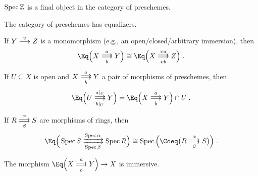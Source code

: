 \documentclass[a4paper,parskip=half,numbers=enddot, DIV=12]{scrreprt}
\begin{document}
\begin{cor}
	$\operatorname{Spec}\mathbb{Z}$ is a final object in the category of preschemes.
\end{cor}
\begin{cor}
	\begin{alphanumerate}
		\item {}The category of preschemes has equalizers.
		\item If $Y\morphism[\upsilon]Z$ is a monomorphism (e.g., an open/closed/arbitrary immersion), then
		\begin{align*}
			\Eq\Big(X\doublemorphism[a][b]Y\Big)\cong\Eq\Big(X\doublemorphism[\upsilon a][\upsilon b]Z\Big)\;.
		\end{align*}
		\item If $U\subseteq X$ is open and $X\doublemorphism[\smash{a}][b]Y$ a pair of morphisms of preschemes, then
		\begin{align*}
			\Eq\Big(U\doublemorphism[a|_U][b|_U]Y\Big)=\Eq\Big(X\doublemorphism[a][b]Y\Big)\cap U\;.
		\end{align*}
		\item If $R\doublemorphism[\smash{\alpha}][\smash{\beta}]S$ are morphisms of rings, then
		\begin{align*}
			\Eq\Big(\Spec S\xdoublemorphism[\Spec \alpha][\Spec \beta]\Spec R\Big)\cong \Spec\Big(\Coeq\big(R\doublemorphism[\smash{\alpha}][\smash{\beta}]S\big)\Big)\;.
		\end{align*}
		\item The morphism $\Eq\Big(X\doublemorphism[a][b]Y\Big)\morphism X$ is immersive.
	\end{alphanumerate}
\end{cor}
\end{document}
